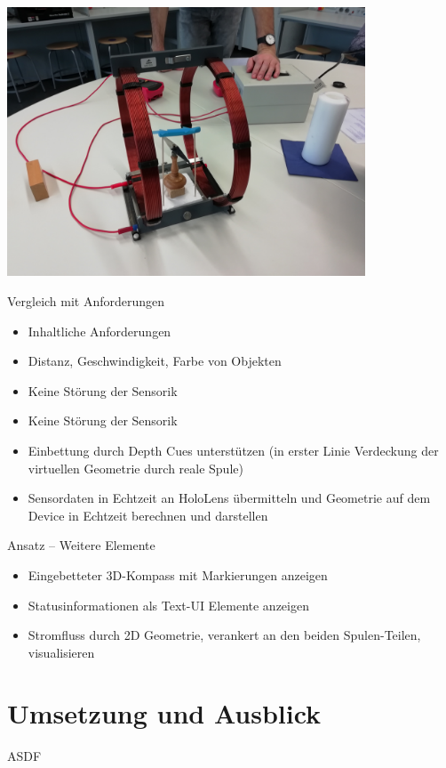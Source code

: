 \begin{frame}
\vspace{-1em}
\begin{center}
	\includegraphics[width=0.8\textwidth]{images/Design_Magnetfeld.jpg}	
\end{center}
\end{frame}

\begin{frame}[fragile]{Vergleich mit Anforderungen}
\begin{itemize}
	\item Inhaltliche Anforderungen
	\item Distanz, Geschwindigkeit, Farbe von Objekten
	\item Keine Störung der Sensorik
	\item Keine Störung der Sensorik	
	
	\item Einbettung durch Depth Cues unterstützen (in erster Linie Verdeckung der virtuellen Geometrie durch reale Spule)
	\item Sensordaten in Echtzeit an HoloLens übermitteln und Geometrie auf dem Device in Echtzeit berechnen und darstellen
\end{itemize}
\end{frame}

\begin{frame}[fragile]{Ansatz -- Weitere Elemente }
\begin{itemize}
	\item Eingebetteter 3D-Kompass mit Markierungen anzeigen
	\item Statusinformationen als Text-UI Elemente anzeigen
	\item Stromfluss durch 2D Geometrie, verankert an den beiden Spulen-Teilen, visualisieren
\end{itemize}
\end{frame}


\part{Umsetzung und Ausblick}
\label{part:practice}

\begin{frame}[fragile]{}
ASDF
\end{frame}